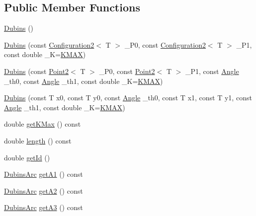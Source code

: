 \subsection*{Public Member Functions}
\begin{DoxyCompactItemize}
\item 
\mbox{\hyperlink{class_dubins_acc45a9db5f20150b58d4fc36ad1548fa}{Dubins}} ()
\item 
\mbox{\hyperlink{class_dubins_aa967d7d3009612ab99ac0b8e7ec33c83}{Dubins}} (const \mbox{\hyperlink{class_configuration2}{Configuration2}}$<$ T $>$ \+\_\+\+P0, const \mbox{\hyperlink{class_configuration2}{Configuration2}}$<$ T $>$ \+\_\+\+P1, const double \+\_\+K=\mbox{\hyperlink{dubins_8hh_a940b85a83458e94519f2685b33ddd276}{K\+M\+AX}})
\item 
\mbox{\hyperlink{class_dubins_a6120f64c71b7a37bc1051f9f87c02e9e}{Dubins}} (const \mbox{\hyperlink{class_point2}{Point2}}$<$ T $>$ \+\_\+\+P0, const \mbox{\hyperlink{class_point2}{Point2}}$<$ T $>$ \+\_\+\+P1, const \mbox{\hyperlink{class_angle}{Angle}} \+\_\+th0, const \mbox{\hyperlink{class_angle}{Angle}} \+\_\+th1, const double \+\_\+K=\mbox{\hyperlink{dubins_8hh_a940b85a83458e94519f2685b33ddd276}{K\+M\+AX}})
\item 
\mbox{\hyperlink{class_dubins_a8f2efa271286dda2c669988b600ac858}{Dubins}} (const T x0, const T y0, const \mbox{\hyperlink{class_angle}{Angle}} \+\_\+th0, const T x1, const T y1, const \mbox{\hyperlink{class_angle}{Angle}} \+\_\+th1, const double \+\_\+K=\mbox{\hyperlink{dubins_8hh_a940b85a83458e94519f2685b33ddd276}{K\+M\+AX}})
\item 
double \mbox{\hyperlink{class_dubins_a5e9a9f09ceed8f592fd35d078090854e}{get\+K\+Max}} () const
\item 
double \mbox{\hyperlink{class_dubins_ae4978fe0667d364224c0a7521903a225}{length}} () const
\item 
double \mbox{\hyperlink{class_dubins_a5781212ce32e684018104d2c0676ceb6}{get\+Id}} ()
\item 
\mbox{\hyperlink{class_dubins_arc}{Dubins\+Arc}} \mbox{\hyperlink{class_dubins_af21928e1891ba40fd036af507a67b0bb}{get\+A1}} () const
\item 
\mbox{\hyperlink{class_dubins_arc}{Dubins\+Arc}} \mbox{\hyperlink{class_dubins_a5157eff5ac184488b43cf9933cab6479}{get\+A2}} () const
\item 
\mbox{\hyperlink{class_dubins_arc}{Dubins\+Arc}} \mbox{\hyperlink{class_dubins_ad0bddc489338c85901221e8c0c5dd638}{get\+A3}} () const
\item 

\end{DoxyCompactItemize}

